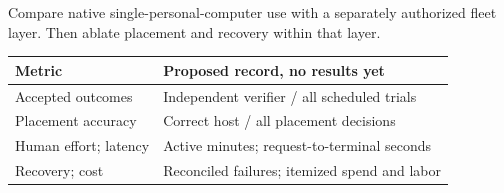 \small Compare native single-personal-computer use with a separately authorized fleet layer. Then ablate placement and recovery within that layer.\par\vspace{.2cm}
\begin{tabular}{p{.28\linewidth}p{.63\linewidth}}
\toprule
Metric & Proposed record, no results yet\\\midrule
Accepted outcomes & Independent verifier / all scheduled trials\\
Placement accuracy & Correct host / all placement decisions\\
Human effort; latency & Active minutes; request-to-terminal seconds\\
Recovery; cost & Reconciled failures; itemized spend and labor\\\bottomrule
\end{tabular}
